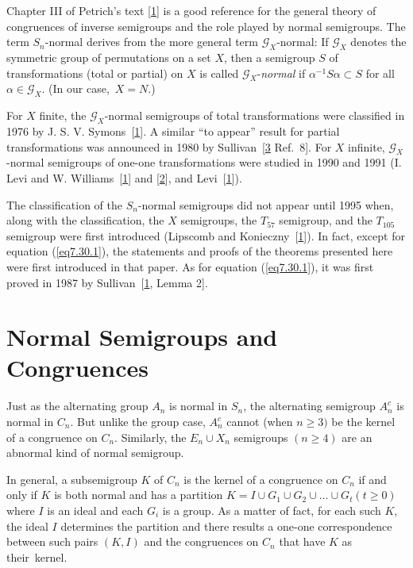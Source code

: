 \documentclass{surv-l}
\numberwithin{equation}{section}
\numberwithin{table}{section}
\numberwithin{figure}{section}
\theoremstyle{definition}
\begin{document}
Chapter III of Petrich's text [\hyperlink{bib60}{1}] is a
good reference for the general theory of congruences of inverse
semigroups and the role played by normal semigroups. The term
$S_{n}$-normal derives from the more general term
$\mathcal{G}_X$-normal: If $\mathcal{G}_X$ denotes the symmetric
group of permutations on a set $X$, then a semigroup $S$ of
transformations (total or partial) on $X$ is called
$\mathcal{G}_X$-\emph{normal} if $\alpha^{-1}S\alpha \subset S$
for all $\alpha\in \mathcal{G}_X$. (In our case,~$X=N$.)

For $X$ finite, the $\mathcal{G}_X$-normal semigroups of total
transformations were classified in 1976 by J. S. V.
Symons~[\hyperlink{bib75}{1}]. A
similar ``to appear'' result for partial transformations was
announced in 1980 by Sullivan~[\hyperlink{bib72b}{3} Ref.~8]. For $X$ infinite,
$\mathcal{G}_X$-normal semigroups of one-one transformations were
studied in 1990 and 1991 (I. Levi and W.
Williams~[\hyperlink{bib41}{1}] and
[\hyperlink{bib41a}{2}], and Levi~[\hyperlink{bib40}{1}]).

The classification of the $S_{n}$-normal semigroups did not appear
until 1995 when, along with the classification, the $X$
semigroups, the $T_{57}$ semigroup, and the $T_{105}$ semigroup
were first introduced (Lipscomb and
Konieczny~[\hyperlink{bib44}{1}]). In fact, except for
equation (\ref{eq7.30.1}), the statements and proofs of the
theorems presented here were first introduced in that paper. As
for equation (\ref{eq7.30.1}), it was first proved in 1987 by
Sullivan~[\hyperlink{bib72}{1}, Lemma 2].

\chapter{Normal Semigroups and Congruences}\label{chap8}

Just as the alternating group $A_{n}$ is normal in $S_{n}$, the
alternating semigroup $A_{n}^{c}$ is normal in $C_{n}$. But unlike
the group case, $A_{n}^{c}$ cannot (when $n\geq 3)$ be the kernel
of a congruence on $C_{n}$. Similarly, the
$E_{n}\cup X_{n}$ semigroups $(n\geq 4)$ are an abnormal kind of
normal semigroup.

In general, a subsemigroup $K$ of $C_{n}$ is the kernel of a
congruence on $C_{n}$ if and only if $K$ is both normal and has a
partition $K=I \cup G_{1}\cup G_{2}\cup\ldots\cup G_{t} (t\geq 0)$
where $I$ is an ideal and each $G_{i}$ is a group. As a matter of
fact, for each such $K$, the ideal $I$ determines the partition and
there results a one-one correspondence between such pairs $(K, I)$
and the congruences on $C_{n}$ that have $K$ as their~kernel.
\end{document}
